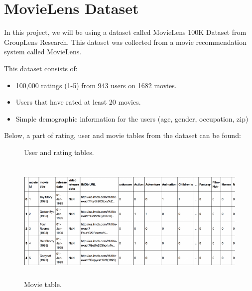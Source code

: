 \documentclass[12pt,a4paper]{report}
\begin{document}
\section{MovieLens Dataset}

In this project, we will be using a dataset called MovieLens 100K Dataset from GroupLens Research. This dataset was collected from a movie recommendation system called MovieLens.

This dataset consists of:
\vspace{-5mm}
\begin{itemize}
    \item 100,000 ratings (1-5) from 943 users on 1682 movies.
    \item Users that have rated at least 20 movies. 
    \item Simple demographic information for the users (age, gender, occupation, zip)
\end{itemize}
 Below, a part of rating, user and movie tables from the dataset can be found:
 \begin{figure}[h]%
    \centering
    \qquad
    \caption{User and rating tables.}%
    \label{fig:example}%
\end{figure} 

 \begin{figure}[h]
    \centering
    \includegraphics[width=14cm, height=6cm]{movie.png}
    \caption{Movie table.}
\end{figure}
\end{document}
